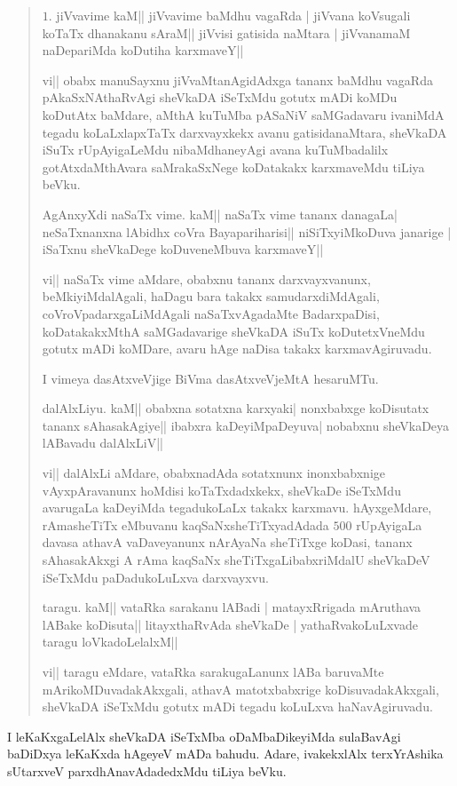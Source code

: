 \begin{verse}
$1.$ jiVvavime kaM|| jiVvavime baMdhu vagaRda | jiVvana koVsugali koTaTx dhanakanu sAraM|| jiVvisi gatisida naMtara | jiVvanamaM naDepariMda koDutiha karxmaveY||

vi|| obabx manuSayxnu jiVvaMtanAgidAdxga tananx baMdhu vagaRda pAkaSxNAthaRvAgi sheVkaDA iSeTxMdu gotutx mADi koMDu koDutAtx baMdare, aMthA kuTuMba pASaNiV saMGadavaru ivaniMdA tegadu koLaLxlapxTaTx darxvayxkekx avanu gatisidanaMtara, sheVkaDA iSuTx rUpAyigaLeMdu nibaMdhaneyAgi avana kuTuMbadalilx gotAtxdaMthAvara saMrakaSxNege koDatakakx karxmaveMdu tiLiya beVku.

AgAnxyXdi naSaTx vime. kaM|| naSaTx vime tananx danagaLa| neSaTxnanxna lAbidhx coVra Bayapariharisi|| niSiTx\-yiMkoDuva janarige | iSaTxnu sheVkaDege koDuveneMbuva karxmaveY||

vi|| naSaTx vime aMdare, obabxnu tananx darxvayxvanunx, beMkiyiMdalAgali, haDagu bara takakx samudarxdiMdAgali, coVroVpadarxgaLiMdAgali naSaTxvAgadaMte BadarxpaDisi, koDatakakxMthA saMGadavarige sheVkaDA iSuTx koDutetxVneMdu gotutx mADi koMDare, avaru hAge naDisa takakx karxmavAgiruvadu.

I vimeya dasAtxveVjige BiVma dasAtxveVjeMtA hesaruMTu.

dalAlxLiyu. kaM|| obabxna sotatxna karxyaki| nonxbabxge koDisutatx tananx sAhasakAgiye|| ibabxra kaDeyiMpaDeyuva| nobabxnu sheVkaDeya lABavadu dalAlxLiV||

vi|| dalAlxLi aMdare, obabxnadAda sotatxnunx inonxbabxnige vAyxpAravanunx hoMdisi koTaTxdadxkekx, sheVkaDe iSeTxMdu avarugaLa kaDeyiMda tegadukoLaLx takakx karxmavu. hAyxgeMdare, rAmasheTiTx eMbuvanu kaqSaNxsheTiTxyadAdada $500$ rUpAyigaLa davasa athavA vaDaveyanunx nArAyaNa sheTiTxge koDasi, tananx sAhasakAkxgi A rAma kaqSaNx sheTiTxgaLibabxriMdalU sheVkaDeV iSeTxMdu paDadukoLuLxva darxvayxvu.

taragu. kaM|| vataRka sarakanu lABadi | matayxRrigada mAruthava lABake koDisuta|| litayxthaRvAda sheVkaDe | yathaRvakoLuLxvade taragu loVkadoLelalxM||

vi|| taragu eMdare, vataRka sarakugaLanunx lABa baruvaMte mArikoMDuvadakAkxgali, athavA matotxbabxrige koDisuvadakAkxgali, sheVkaDA iSeTxMdu gotutx mADi tegadu koLuLxva haNavAgi\-ruvadu.
\end{verse}

I leKaKxgaLelAlx sheVkaDA iSeTxMba oDaMbaDikeyiMda sulaBavAgi baDiDxya leKaKxda hAgeyeV mADa bahudu. Adare, ivakekxlAlx terxYrAshika sUtarxveV parxdhAnavAdadedxMdu tiLiya beVku. 

